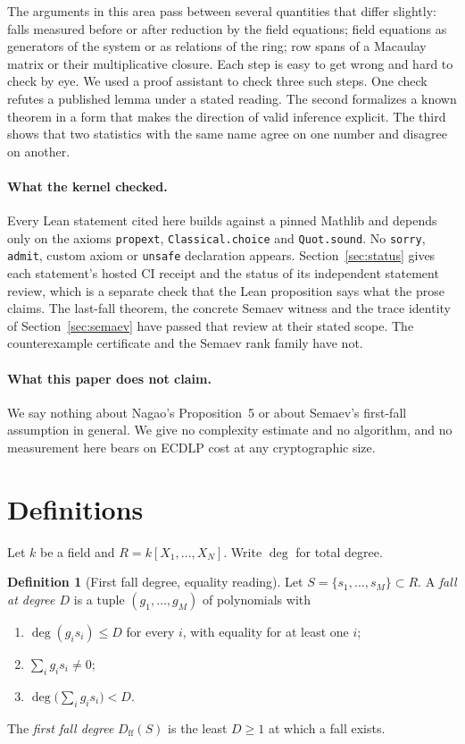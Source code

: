 \documentclass[11pt,a4paper]{article}
\theoremstyle{plain}
\theoremstyle{definition}
\newtheorem{definition}[theorem]{Definition}
\theoremstyle{remark}
\newcommand{\Dff}{D_{\mathrm{ff}}}
\begin{document}
The arguments in this area pass between several quantities that differ
slightly: falls measured before or after reduction by the field equations;
field equations as generators of the system or as relations of the ring; row
spans of a Macaulay matrix or their multiplicative closure. Each step is easy
to get wrong and hard to check by eye. We used a proof assistant to check
three such steps. One check refutes a published lemma under a stated reading.
The second formalizes a known theorem in a form that makes the direction of
valid inference explicit. The third shows that two statistics with the same
name agree on one number and disagree on another.

\paragraph{What the kernel checked.} Every Lean statement cited here builds
against a pinned Mathlib and depends only on the axioms \texttt{propext},
\texttt{Classical.choice} and \texttt{Quot.sound}. No \texttt{sorry},
\texttt{admit}, custom axiom or \texttt{unsafe} declaration appears. Section~\ref{sec:status}
gives each statement's hosted CI receipt and the status of its independent
statement review, which is a separate check that the Lean proposition says
what the prose claims. The last-fall theorem, the concrete Semaev witness and
the trace identity of Section~\ref{sec:semaev} have passed that review at their
stated scope. The counterexample certificate and the Semaev rank family have
not.

\paragraph{What this paper does not claim.} We say nothing about Nagao's
Proposition~5 or about Semaev's first-fall assumption in general. We give no
complexity estimate and no algorithm, and no measurement here bears on
ECDLP cost at any cryptographic size.

\section{Definitions}\label{sec:defs}

Let $k$ be a field and $R=k[X_1,\dots,X_N]$. Write $\deg$ for total degree.

\begin{definition}[First fall degree, equality reading]\label{def:ff}
Let $S=\{s_1,\dots,s_M\}\subset R$. A \emph{fall at degree $D$} is a tuple
$(g_1,\dots,g_M)$ of polynomials with
\begin{enumerate}
\item $\deg(g_i s_i)\le D$ for every $i$, with equality for at least one $i$;
\item $\sum_i g_i s_i\neq 0$;
\item $\deg\bigl(\sum_i g_i s_i\bigr)<D$.
\end{enumerate}
The \emph{first fall degree} $\Dff(S)$ is the least $D\ge 1$ at which a fall
exists.
\end{definition}
\end{document}
